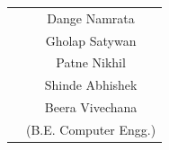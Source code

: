 \documentclass[11pt,fleqn]{book} %
\begin{document}
\begin{flushright}
\begin{tabular}{p{8.2cm}c}
&\hspace{6 mm}Dange Namrata\\
&\hspace{8 mm}Gholap Satywan\\
&Patne Nikhil\\
&\hspace{9mm}Shinde Abhishek\\
&\hspace{9mm}Beera Vivechana\\[1cm]
&\hspace{7 mm}(B.E. Computer Engg.)

\end{tabular}
\end{flushright}

\maketitle
{}
\end{document}
